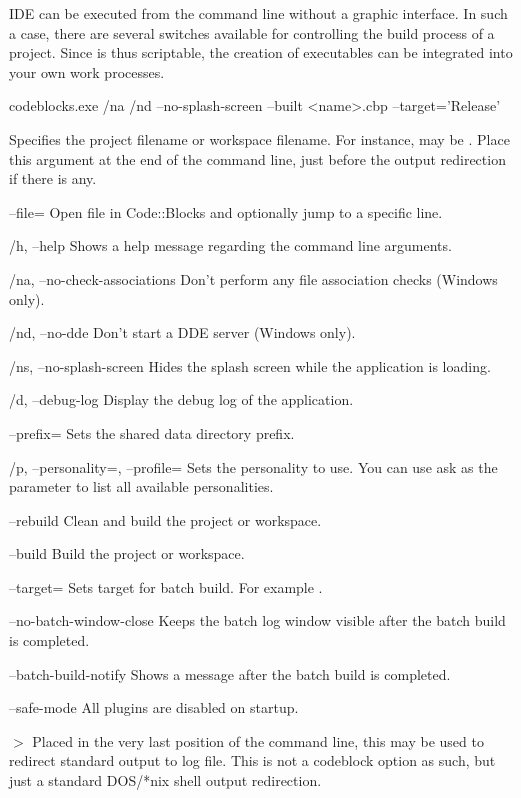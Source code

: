 IDE \codeblocks can be executed from the command line without a graphic interface. In such a case, there are several switches available for controlling the build process of a project. Since \codeblocks is thus scriptable, the creation of executables can be integrated into your own work processes.

\begin{cmd}
codeblocks.exe /na /nd --no-splash-screen --built <name>.cbp --target='Release'
\end{cmd}

\begin{optentry}
\item[\var{filename}] Specifies the project  filename or workspace  filename. For instance,  may be . Place this argument at the end of the command line, just before the output redirection if there is any.
\item[--file=\var{filename}\optional{:line}] Open file in Code::Blocks and optionally jump to a specific line. 
\item[/h, --help] Shows a help message regarding the command line arguments.
\item[/na, --no-check-associations] Don't perform any file association checks (Windows only).
\item[/nd, --no-dde] Don't start a DDE server (Windows only).
\item[/ns, --no-splash-screen] Hides the splash screen while the application is loading.
\item[/d, --debug-log] Display the debug log of the application.
\item[--prefix=\var{str}] Sets the shared data directory prefix.
\item[/p, --personality=\var{str}, --profile=\var{str}] Sets the personality to use. You can use ask as the parameter to list all available personalities.
\item[--rebuild] Clean and build the project or workspace.
\item[--build] Build the project or workspace.
\item[--target=\var{str}] Sets target for batch build. For example .
\item[--no-batch-window-close] Keeps the batch log window visible after the batch build is completed.
\item[--batch-build-notify] Shows a message after the batch build is completed.
\item[--safe-mode] All plugins are disabled on startup.
\item[$>$ \var{build log file}] Placed in the very last position of the command line, this may be used to redirect standard output to log file. This is not a codeblock option as such, but just a standard DOS/*nix shell output redirection.
\end{optentry}

